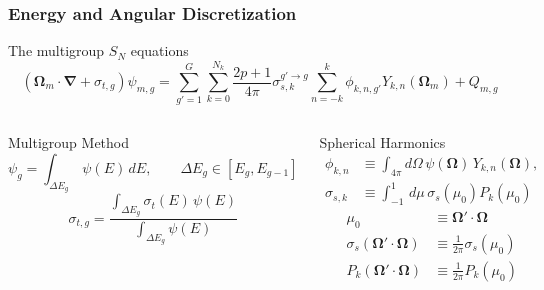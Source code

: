 \documentclass[compress,10pt]{beamer}
\renewcommand{\vec}[1]{\mathbf{#1}}
\begin{document}
\typeout{***********************************************************************************}
\begin{frame}[t]\frametitle{Energy and Angular Discretization}
\begin{block}{The multigroup $S_N$ equations}{\small
\begin{equation*}
\left( \vec{\Omega}_m \cdot \vec{\nabla}  + \sigma_{t,g}  \right)  \psi_{m,g}= \sum_{g'=1}^{G} \sum_{k=0}^{N_k} \frac{2p + 1}{4 \pi} \sigma_{s,k}^{g' \rightarrow g}   \sum_{n=-k}^{k}  \phi_{k,n,g'}  Y_{k,n} (  \vec{\Omega}_m ) +  Q_{m,g}
\end{equation*}}
\end{block}
\centering
\begin{columns}
\begin{block}{Multigroup Method}{\small
\begin{equation*}
\psi_g =\int_{\Delta E_g} \, \psi ( E) \, dE , \qquad \Delta E_g \in \left[  E_g , E_{g-1} \right]
\end{equation*} 
\begin{equation*}
\sigma_{t,g} = \frac{\int_{\Delta E_g} \sigma_t (E) \, \psi (E) }{\int_{\Delta E_g} \psi (E) }
\end{equation*} 
}\end{block}
\begin{block}{Spherical Harmonics}{\small
\vspace{-0.15cm}
\begin{equation*}
\begin{aligned}
\phi_{k,n} &\equiv \int_{4 \pi} d\Omega \, \psi(\vec{\Omega}) \, Y_{k,n} (\vec{\Omega}), \\
\sigma_{s,k} &\equiv  \int_{-1}^{1} \, d \mu \, \sigma_s ( \mu_0) P_k (\mu_0) 
\end{aligned}
\end{equation*}
\vspace{0.2cm}
\begin{equation*}
\begin{aligned}
\mu_0 &\equiv \vec{\Omega}' \cdot \vec{\Omega} \\
\sigma_s ( \vec{\Omega}' \cdot \vec{\Omega}) &\equiv  \frac{1}{2 \pi} \sigma_s ( \mu_0 ) \\
P_k ( \vec{\Omega}' \cdot \vec{\Omega}) &\equiv  \frac{1}{2 \pi} P_k (\mu_0)
\end{aligned}
\end{equation*}
}\end{block}
\end{columns}
\end{frame}
\end{document}
